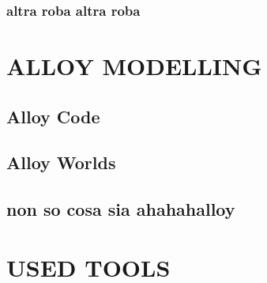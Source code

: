 \documentclass[a4paper, 12pt, titlepage]{article}
\begin{document}
\subsubsection{altra roba altra roba}

\newpage

\section{ALLOY MODELLING} 
\subsection{Alloy Code}
\subsection{Alloy Worlds}
\subsection{non so cosa sia ahahahalloy}
\newpage

\section{USED TOOLS}
\newpage
\end{document}
